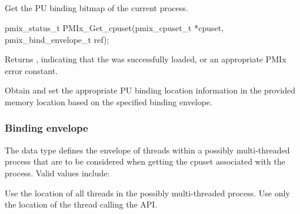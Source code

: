 \subsection{}

\summary

Get the \ac{PU} binding bitmap of the current process.

\format

\cspecificstart
\begin{codepar}
pmix_status_t
PMIx_Get_cpuset(pmix_cpuset_t *cpuset, pmix_bind_envelope_t ref);
\end{codepar}
\cspecificend

\begin{arglist}
\end{arglist}

Returns , indicating that the  was successfully loaded, or an appropriate \ac{PMIx} error constant.

\descr

Obtain and set the appropriate \ac{PU} binding location information in the provided memory location based on the specified binding envelope.

\subsubsection{Binding envelope}
\label{api:proc:bindenv}

The  data type
defines the envelope of threads within a possibly multi-threaded process that are to be considered when getting the cpuset associated with the process. Valid values include:

\begin{constantdesc}
%
Use the location of all threads in the possibly multi-threaded process.
%
Use only the location of the thread calling the \ac{API}.
%
\end{constantdesc}


\subsection{}

